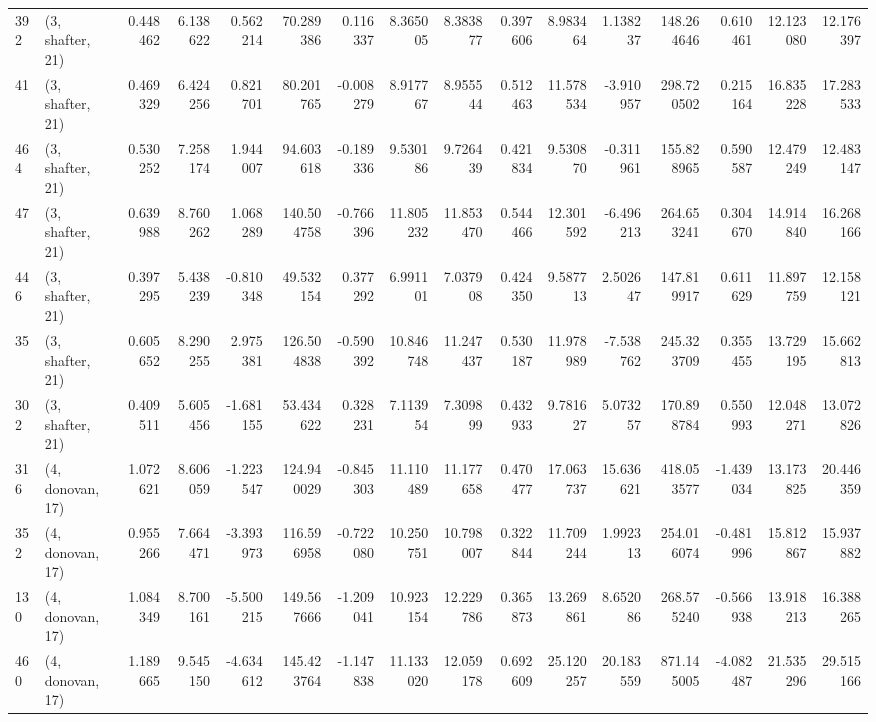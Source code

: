 \begin{tabular}{llrrrrrrrrrrrrrr}
392 &  (3, shafter, 21) &   0.448462 &   6.138622 &   0.562214 &    70.289386 &   0.116337 &   8.365005 &   8.383877 &  0.397606 &   8.983464 &   1.138237 &    148.264646 &    0.610461 &   12.123080 &   12.176397 \\
41  &  (3, shafter, 21) &   0.469329 &   6.424256 &   0.821701 &    80.201765 &  -0.008279 &   8.917767 &   8.955544 &  0.512463 &  11.578534 &  -3.910957 &    298.720502 &    0.215164 &   16.835228 &   17.283533 \\
464 &  (3, shafter, 21) &   0.530252 &   7.258174 &   1.944007 &    94.603618 &  -0.189336 &   9.530186 &   9.726439 &  0.421834 &   9.530870 &  -0.311961 &    155.828965 &    0.590587 &   12.479249 &   12.483147 \\
47  &  (3, shafter, 21) &   0.639988 &   8.760262 &   1.068289 &   140.504758 &  -0.766396 &  11.805232 &  11.853470 &  0.544466 &  12.301592 &  -6.496213 &    264.653241 &    0.304670 &   14.914840 &   16.268166 \\
446 &  (3, shafter, 21) &   0.397295 &   5.438239 &  -0.810348 &    49.532154 &   0.377292 &   6.991101 &   7.037908 &  0.424350 &   9.587713 &   2.502647 &    147.819917 &    0.611629 &   11.897759 &   12.158121 \\
35  &  (3, shafter, 21) &   0.605652 &   8.290255 &   2.975381 &   126.504838 &  -0.590392 &  10.846748 &  11.247437 &  0.530187 &  11.978989 &  -7.538762 &    245.323709 &    0.355455 &   13.729195 &   15.662813 \\
302 &  (3, shafter, 21) &   0.409511 &   5.605456 &  -1.681155 &    53.434622 &   0.328231 &   7.113954 &   7.309899 &  0.432933 &   9.781627 &   5.073257 &    170.898784 &    0.550993 &   12.048271 &   13.072826 \\
316 &  (4, donovan, 17) &   1.072621 &   8.606059 &  -1.223547 &   124.940029 &  -0.845303 &  11.110489 &  11.177658 &  0.470477 &  17.063737 &  15.636621 &    418.053577 &   -1.439034 &   13.173825 &   20.446359 \\
352 &  (4, donovan, 17) &   0.955266 &   7.664471 &  -3.393973 &   116.596958 &  -0.722080 &  10.250751 &  10.798007 &  0.322844 &  11.709244 &   1.992313 &    254.016074 &   -0.481996 &   15.812867 &   15.937882 \\
130 &  (4, donovan, 17) &   1.084349 &   8.700161 &  -5.500215 &   149.567666 &  -1.209041 &  10.923154 &  12.229786 &  0.365873 &  13.269861 &   8.652086 &    268.575240 &   -0.566938 &   13.918213 &   16.388265 \\
460 &  (4, donovan, 17) &   1.189665 &   9.545150 &  -4.634612 &   145.423764 &  -1.147838 &  11.133020 &  12.059178 &  0.692609 &  25.120257 &  20.183559 &    871.145005 &   -4.082487 &   21.535296 &   29.515166 \\

\end{tabular}
